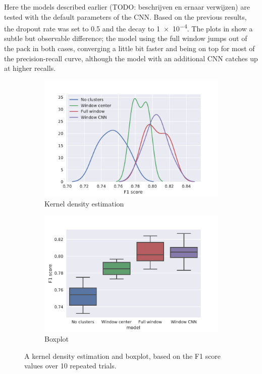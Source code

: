 Here the models described earlier (TODO: beschrijven en ernaar verwijzen) are
tested with the default parameters of the CNN\@. Based on the previous results,
the dropout rate was set to 0.5 and the decay to \num{1e-4}.
The plots in  show a subtle but observable difference; the
model using the full window jumps out of the pack in both cases, converging a
little bit faster and being on top for most of the precision-recall curve,
although the model with an additional CNN catches up at higher recalls.

\begin{figure}[tb]
  \centering
  \begin{subfigure}[t]{0.49\textwidth}
    \centering
    \includegraphics[width=\textwidth]{./figures/results/models/kde_f1.pdf}
    \caption{Kernel density estimation}%
    \label{fig:model_kde}
  \end{subfigure}
  \begin{subfigure}[t]{0.49\textwidth}
    \centering
    \includegraphics[width=\textwidth]{./figures/results/models/boxplot_f1.pdf}
    \caption{Boxplot}%
    \label{fig:model_box}
  \end{subfigure}
  \caption{A kernel density estimation and boxplot, based on the F1 score values
  over 10 repeated trials.}%
  \label{fig:model_dists}
\end{figure}

